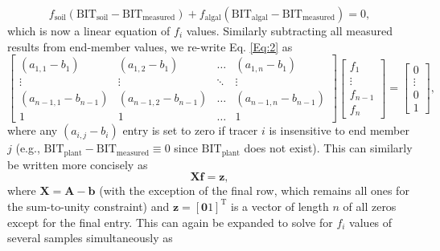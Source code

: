 \documentclass{amsart}
\begin{document}
\begin{equation}\label{Eq:8}
	f_\text{soil} \left( \text{BIT}_\text{soil} - \text{BIT}_\text{measured} \right) + f_\text{algal} \left( \text{BIT}_\text{algal} - \text{BIT}_\text{measured} \right) = 0,
\end{equation}
%
which is now a linear equation of $f_i$ values. Similarly subtracting all measured results from end-member values, we re-write Eq. \ref{Eq:2} as
%
\begin{equation}\label{Eq:9}
	\begin{bmatrix}
		(a_{1,1} - b_1) & (a_{1,2} - b_1) & \dots & (a_{1,n} - b_1) \\
		\vdots & \vdots & \ddots & \vdots \\
		(a_{n-1,1} - b_{n-1}) & (a_{n-1,2} - b_{n-1}) & \dots & (a_{n-1,n} - b_{n-1}) \\
		1 & 1 & \dots & 1
	\end{bmatrix}
	\begin{bmatrix}
		f_1 \\
		\vdots \\
		f_{n-1} \\
		f_n
	\end{bmatrix}
	=
	\begin{bmatrix}
		0 \\
		\vdots \\
		0 \\
		1 
	\end{bmatrix},
\end{equation}
%
where any $(a_{i,j} - b_i)$ entry is set to zero if tracer $i$ is insensitive to end member $j$ (e.g., $\text{BIT}_\text{plant} - \text{BIT}_\text{measured} \equiv 0$ since $\text{BIT}_\text{plant}$ does not exist). This can similarly be written more concisely as
%
\begin{equation}\label{Eq:10}
	\bm{X} \bm{f} = \bm{z},
\end{equation}
%
where $\bm{X} = \bm{A}-\bm{b}$ (with the exception of the final row, which remains all ones for the sum-to-unity constraint) and $\bm{z} = \left[ \bm{0} 1\right]^\text{T}$ is a vector of length $n$ of all zeros except for the final entry. This can again be expanded to solve for $f_i$ values of several samples simultaneously as
\end{document}

